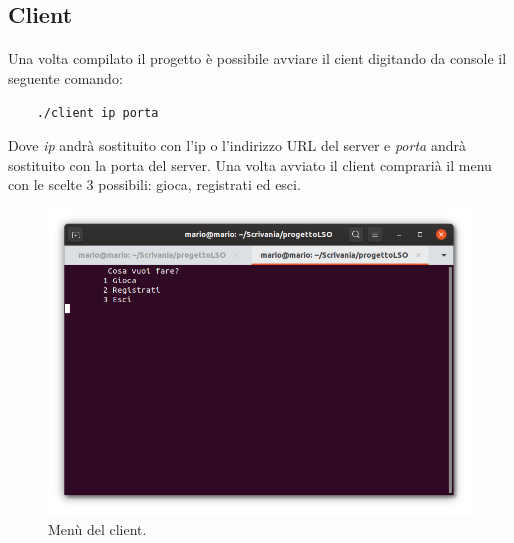 \documentclass[a4paper]{article}
\begin{document}
\subsection{Client}
\paragraph{}
Una volta compilato il progetto è possibile avviare il cient digitando da console il seguente comando:
\begin{verbatim}
    ./client ip porta
\end{verbatim}
Dove \textit{ip} andrà sostituito con l'ip o l'indirizzo URL del server e \textit{porta} andrà sostituito con la porta del server.
Una volta avviato il client comprarià il menu con le scelte 3 possibili: gioca, registrati ed esci.\\
\begin{figure}[H]
  \includegraphics[width=\textwidth]{menuClient}
  \caption{Menù del client.}
\end{figure}
\end{document}
